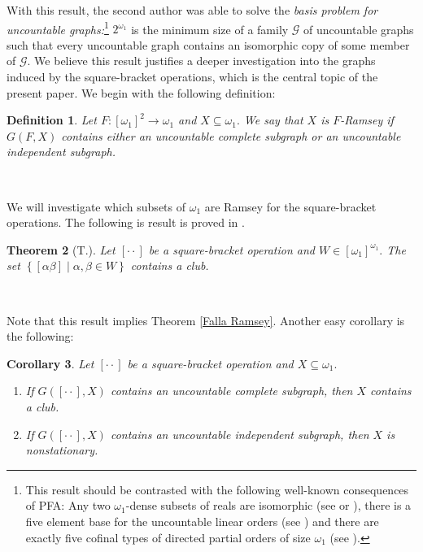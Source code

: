 \documentclass{article}
\newtheorem{theorem}{Theorem}
\newtheorem{corollary}[theorem]{Corollary}
\newtheorem{definition}[theorem]{Definition}
\begin{document}
With this result, the second author was able to solve the \emph{basis problem
for uncountable graphs:}\footnote{This result should be contrasted with the
following well-known consequences of \textsf{PFA: }Any two $\omega_{1}$-dense
subsets of reals are isomorphic (see
\cite{Allw1DenseSetsofRealscanbeIsomorphic} or \cite{ApplicationsofPFA}),
there is a five element base for the uncountable linear orders (see
\cite{FiveElementBasis}) and there are exactly five cofinal types of directed
partial orders of size $\omega_{1}$ (see \cite{5CofinalTypes}).}\emph{
}$2^{\omega_{1}}$ is\emph{ }the minimum size of a family $\mathcal{G}$ of
uncountable graphs such that every uncountable graph contains an isomorphic
copy of some member of $\mathcal{G}.$ We believe this result justifies a
deeper investigation into the graphs induced by the square-bracket operations,
which is the central topic of the present paper. We begin with the following definition:

\begin{definition}
Let $F:\left[  \omega_{1}\right]  ^{2}\longrightarrow\omega_{1}$ and
$X\subseteq\omega_{1}.$ We say that $X$ is $F$\emph{-Ramsey }if $G\left(
F,X\right)  $ contains either an uncountable complete subgraph or an
uncountable independent subgraph. \label{Def F Ramsey}
\end{definition}

\qquad\ \ \qquad\ \ 

We will investigate which subsets of $\omega_{1}$ are Ramsey for the
square-bracket operations. The following is result is proved in \cite{Walks}.

\begin{theorem}
[T.]Let $[\cdot\cdot]$ be a square-bracket operation and $W\in\left[
\omega_{1}\right]  ^{\omega_{1}}.$ The set $\left\{  \left[  \alpha
\beta\right]  \mid\alpha,\beta\in W\right\}  $ contains a club.
\label{sq bracket general contiene club}
\end{theorem}

\qquad\ \ 

Note that this result implies Theorem \ref{Falla Ramsey}. Another easy
corollary is the following:

\begin{corollary}
Let $[\cdot\cdot]$ be a square-bracket operation and $X\subseteq\omega_{1}.$
\label{Corol 1}

\begin{enumerate}
\item If $G([\cdot\cdot],X)$ contains an uncountable complete subgraph, then
$X$ contains a club.

\item If $G([\cdot\cdot],X)$ contains an uncountable independent subgraph,
then $X$ is nonstationary.
\end{enumerate}
\end{corollary}
\end{document}
